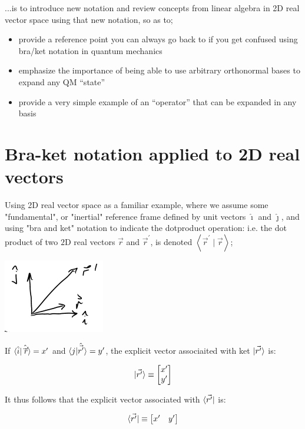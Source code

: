 \documentclass{article}
\begin{document}
...is to introduce new notation and review concepts from linear algebra in 2D real vector space using that new notation, so as to;

\begin{itemize}
    \item provide a reference point you can always go back to if you get confused using bra/ket notation in quantum mechanics
    \item emphasize the importance of being able to use arbitrary orthonormal bases to expand any QM “state”
    \item provide a very simple example of an “operator” that can be expanded in any basis
\end{itemize}

\section{Bra-ket notation applied to 2D real vectors}

Using 2D real vector space as a familiar example, where we assume some "fundamental", or "inertial" reference frame defined by unit vectors $\hat{\imath}$ and $\hat{\jmath}$, and using "bra and ket" notation to indicate the dotproduct operation: i.e. the dot product of two $2 \mathrm{D}$ real vectors $\vec{r}$ and $\vec{r}^{\prime}$, is denoted $\left\langle\vec{r}^{\prime} \mid \vec{r}\right\rangle$;

\includegraphics[width = 0.3 \textwidth]{Lecture11/1.png}

If $\braket{\hat{i} | \hat{\vec{r}'}} = x'$ and $\braket{j | \hat{\vec{r'}}} = y'$, the explicit vector associaited with ket $\ket{\vec{r'}}$ is:

$$\ket{\vec{r'}} \equiv \begin{bmatrix} x' \\ y' \end{bmatrix}$$

It thus follows that the explicit vector associated with $\bra{\vec{r'}}$ is:

$$\bra{\vec{r'}} \equiv \begin{bmatrix} x' & y' \end{bmatrix}$$
\end{document}
